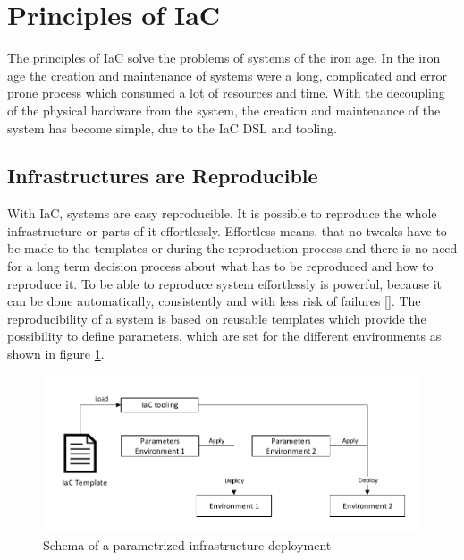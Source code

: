 \section{Principles of IaC}
\label{sec:iac-principles}
The principles of IaC solve the problems of systems of the iron age. In the iron age the creation and maintenance of systems were a long, complicated and error prone process which consumed a lot of resources and time. With the decoupling of the physical hardware from the system, the creation and maintenance of the system has become simple, due to the IaC DSL and tooling. 

\subsection{Infrastructures are Reproducible}
\label{sec:iac-principles-reproducibility}
With IaC, systems are easy reproducible. It is possible to reproduce the whole infrastructure or parts of it effortlessly. Effortless means, that no tweaks have to be made to the templates or during the reproduction process and there is no need for a long term decision process about what has to be reproduced and how to reproduce it. To be able to reproduce system effortlessly is powerful, because it can be done automatically, consistently and with less risk of failures [\cite[p. 10]{Morris2016}]. The reproducibility of a system is based on reusable templates which provide the possibility to define parameters, which are set for the different environments as shown in figure \ref{fig:reproduce-infrastructure}.
\begin{figure}[htbp]
	\centering
	\includegraphics[scale=0.95]{images/reproduce-infrastructure.pdf}
	\caption{Schema of a parametrized infrastructure deployment}
	\label{fig:reproduce-infrastructure}
\end{figure} 

